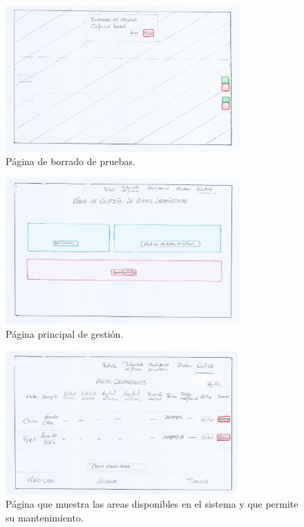 \begin{figure}[!htbp]
  \centering
    \includegraphics[width=0.8\textwidth]{../img/prototipado/alta/borradopruebas.png}
  \caption{Página de borrado de pruebas.}
  \label{borradopruebas}
\end{figure}

\begin{figure}[!htbp]
  \centering
    \includegraphics[width=0.8\textwidth]{../img/prototipado/alta/gestion.png}
  \caption{Página principal de gestión.}
  \label{gestion}
\end{figure}

\begin{figure}[!htbp]
  \centering
    \includegraphics[width=0.8\textwidth]{../img/prototipado/alta/areasdispo.png}
  \caption{Página que muestra las areas disponibles en el sistema y que permite su mantenimiento.}
  \label{areasdispo}
\end{figure}

